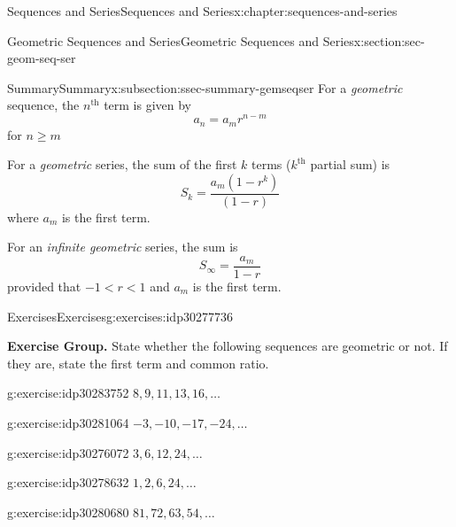 \documentclass[twoside,10pt,]{book}
\numberwithin{equation}{section}
\newcommand{\nth}{{n^{\text{th}}}}
\newcommand{\kth}{{k^{\text{th}}}}
\newcommand{\lt}{<}
\begin{document}
\begin{chapterptx}{Sequences and Series}{}{Sequences and Series}{}{}{x:chapter:sequences-and-series}
\begin{sectionptx}{Geometric Sequences and Series}{}{Geometric Sequences and Series}{}{}{x:section:sec-geom-seq-ser}
\typeout{************************************************}
%
\begin{subsectionptx}{Summary}{}{Summary}{}{}{x:subsection:ssec-summary-gemseqser}
For a \emph{geometric} sequence, the \(\nth{}\) term is given by%
\begin{equation*}
{a_n} = {a_m}{r^{n - m}}
\end{equation*}
for \(n \ge m\)%
\par
For a \emph{geometric} series, the sum of the first \(k\) terms (\(\kth{}\) partial sum) is%
\begin{equation*}
{S_k} = \frac{{{a_m}\left( {1 - {r^k}} \right)}}{{\left( {1 - r} \right)}}
\end{equation*}
where \(a_m\) is the first term.%
\par
For an \emph{infinite geometric} series, the sum is%
\begin{equation*}
{S_\infty } = \frac{{{a_m}}}{{1 - r}}
\end{equation*}
provided that  \(-1 \lt r \lt 1\) and \(a_m\) is the first term.%
\end{subsectionptx}
%
%
\typeout{************************************************}
\typeout{************************************************}
%
\begin{exercises-subsection}{Exercises}{}{Exercises}{}{}{g:exercises:idp30277736}
\par\medskip\noindent%
\textbf{Exercise Group.}\space\space%
State whether the following sequences are geometric or not.  If they are, state the first term and common ratio.\begin{exercisegroup}
\begin{divisionexerciseeg}{1}{}{}{g:exercise:idp30283752}%
\(8, 9, 11, 13, 16, \ldots\)\end{divisionexerciseeg}%
\begin{divisionexerciseeg}{2}{}{}{g:exercise:idp30281064}%
\(-3, -10, -17, -24, \ldots\)\end{divisionexerciseeg}%
\begin{divisionexerciseeg}{3}{}{}{g:exercise:idp30276072}%
\(3, 6, 12, 24, \ldots\)\end{divisionexerciseeg}%
\begin{divisionexerciseeg}{4}{}{}{g:exercise:idp30278632}%
\(1, 2, 6, 24, \ldots\)\end{divisionexerciseeg}%
\begin{divisionexerciseeg}{5}{}{}{g:exercise:idp30280680}%
\(81, 72, 63, 54, \ldots\)\end{divisionexerciseeg}%

\end{exercisegroup}
\end{exercises-subsection}
\end{sectionptx}
\end{chapterptx}
\end{document}

